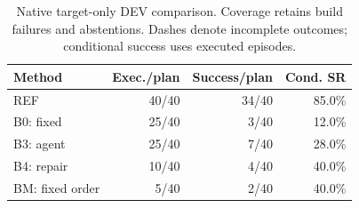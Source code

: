 \begin{table}[t]
\centering\small
\caption{Native target-only DEV comparison. Coverage retains build failures and abstentions. Dashes denote incomplete outcomes; conditional success uses executed episodes.}
\label{tab:native-dev}
\begin{tabular}{lrrr}
\toprule
Method & Exec./plan & Success/plan & Cond. SR \\
\midrule
REF & 40/40 & 34/40 & 85.0\% \\
B0: fixed & 25/40 & 3/40 & 12.0\% \\
B3: agent & 25/40 & 7/40 & 28.0\% \\
B4: repair & 10/40 & 4/40 & 40.0\% \\
BM: fixed order & 5/40 & 2/40 & 40.0\% \\
\bottomrule
\end{tabular}
\end{table}
